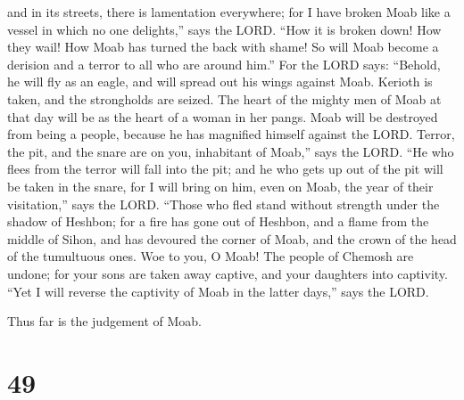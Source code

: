 and in its streets, there is lamentation everywhere; for I have broken
Moab like a vessel in which no one delights,'' says the LORD.
 ``How it is broken down! How they wail! How Moab has
turned the back with shame! So will Moab become a derision and a terror
to all who are around him.''  For the LORD says: ``Behold,
he will fly as an eagle, and will spread out his wings against Moab.
 Kerioth is taken, and the strongholds are seized. The
heart of the mighty men of Moab at that day will be as the heart of a
woman in her pangs.  Moab will be destroyed from being a
people, because he has magnified himself against the LORD. 
Terror, the pit, and the snare are on you, inhabitant of Moab,'' says
the LORD.  ``He who flees from the terror will fall into
the pit; and he who gets up out of the pit will be taken in the snare,
for I will bring on him, even on Moab, the year of their visitation,''
says the LORD.  ``Those who fled stand without strength
under the shadow of Heshbon; for a fire has gone out of Heshbon, and a
flame from the middle of Sihon, and has devoured the corner of Moab, and
the crown of the head of the tumultuous ones.  Woe to you,
O Moab! The people of Chemosh are undone; for your sons are taken away
captive, and your daughters into captivity.  ``Yet I will
reverse the captivity of Moab in the latter days,'' says the LORD.

Thus far is the judgement of Moab.

\hypertarget{section-48}{%
\section{49}\label{section-48}}

